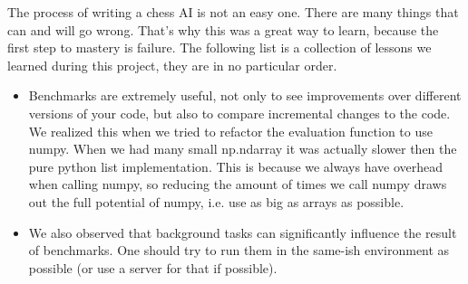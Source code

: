 The process of writing a chess AI is not an easy one.
There are many things that can and will go wrong.
That's why this was a great way to learn,
because the first step to mastery is failure.
The following list is a collection of lessons we learned during
this project, they are in no particular order.

\begin{itemize}
  \item{
Benchmarks are extremely useful,
not only to see improvements over different versions of your code,
but also to compare incremental changes to the code.
We realized this when we tried to refactor the evaluation function to use numpy.
When we had many small np.ndarray it was actually slower then the pure python list implementation.
This is because we always have overhead when calling numpy,
so reducing the amount of times we call numpy draws out the full potential of numpy,
i.e. use as big as arrays as possible.
}
  \item{
We also observed that background tasks can significantly influence the result of benchmarks.
One should try to run them in the same-ish environment as possible
(or use a server for that if possible).
}
\end{itemize}
